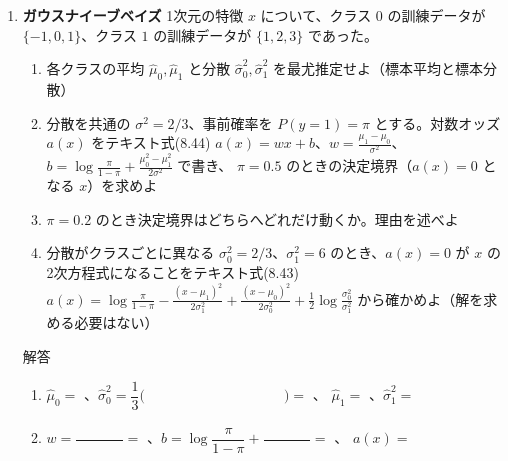 \documentclass[a4paper,dvipdfmx]{jsarticle}
\newcommand{\提出期限}{2026年11月16日（月）}
\newcommand{\学籍番号}{0000000}
\newcommand{\氏名}{氏名を書く}
\newcommand{\提出日}{2026年11月16日}
\newenvironment{answer}{\begin{itembox}[l]{解答}}{\end{itembox}}
\begin{document}
\begin{enumerate}
\begin{answer}
\begin{enumerate}
          \begin{align*}
            \mathbb{E}[\theta \mid D] &= \frac{1}{Z}\int_0^1 \phantom{XXXXXXXXXXXXXX}\,d\theta = \phantom{XXXXXXXXXXXXXX} \\
            &= \phantom{XXXXXXXXXXXXXXXXXX} = \frac{k + \alpha}{n + \alpha + \beta}
          \end{align*}
        \item 最尤推定 $= $ \phantom{XXXX}、MAP推定 $= \dfrac{\phantom{XXXX}}{\phantom{XXXX}} = $ \phantom{XXXX}、事後平均 $= \dfrac{\phantom{XXXX}}{\phantom{XXXX}} \approx$ \phantom{XXXX}
          \vspace{2mm}
      \end{enumerate}
    \end{answer}

  \item \textbf{ガウスナイーブベイズ}\quad
    1次元の特徴 $x$ について、クラス $0$ の訓練データが $\{-1, 0, 1\}$、クラス $1$ の訓練データが $\{1, 2, 3\}$ であった。
    \begin{enumerate}
      \item 各クラスの平均 $\hat{\mu}_0, \hat{\mu}_1$ と分散 $\hat{\sigma}_0^2, \hat{\sigma}_1^2$ を最尤推定せよ（標本平均と標本分散）
      \item 分散を共通の $\sigma^2 = 2/3$、事前確率を $P(y = 1) = \pi$ とする。対数オッズ $a(x)$ をテキスト式(8.44)
        $a(x) = wx + b$、$w = \frac{\mu_1 - \mu_0}{\sigma^2}$、$b = \log\frac{\pi}{1 - \pi} + \frac{\mu_0^2 - \mu_1^2}{2\sigma^2}$ で書き、
        $\pi = 0.5$ のときの決定境界（$a(x) = 0$ となる $x$）を求めよ
      \item $\pi = 0.2$ のとき決定境界はどちらへどれだけ動くか。理由を述べよ
      \item 分散がクラスごとに異なる $\sigma_0^2 = 2/3$、$\sigma_1^2 = 6$ のとき、$a(x) = 0$ が $x$ の2次方程式になることをテキスト式(8.43)
        $a(x) = \log\frac{\pi}{1 - \pi} - \frac{(x - \mu_1)^2}{2\sigma_1^2} + \frac{(x - \mu_0)^2}{2\sigma_0^2} + \frac{1}{2}\log\frac{\sigma_0^2}{\sigma_1^2}$
        から確かめよ（解を求める必要はない）
    \end{enumerate}
    \begin{answer}
      \begin{enumerate}
        \item $\hat{\mu}_0 = $ \phantom{XXXX}、$\hat{\sigma}_0^2 = \dfrac{1}{3}\bigl(\phantom{XXXXXXXXXXXX}\bigr) = $ \phantom{XXXX}、\quad
          $\hat{\mu}_1 = $ \phantom{XXXX}、$\hat{\sigma}_1^2 = $ \phantom{XXXX}
          \vspace{4mm}
        \item $w = \dfrac{\phantom{XXXX}}{\phantom{XXXX}} = $ \phantom{XX}、$b = \log\dfrac{\pi}{1 - \pi} + \dfrac{\phantom{XXXX}}{\phantom{XXXX}} = $ \phantom{XXXXXXXXXX}、\quad
          $a(x) = $ \phantom{XXXXXXXXXXXX}
          \vspace{2mm}


\end{enumerate}
\end{answer}
\end{enumerate}
\end{document}
